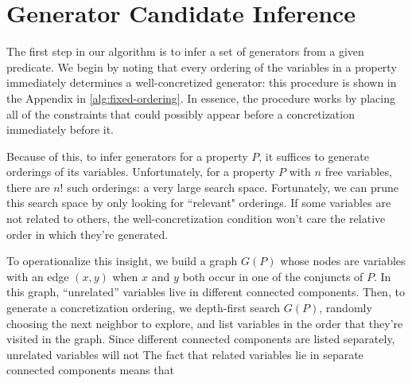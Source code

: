 \documentclass[sigconf,nonacm,review,anonymous]{acmart}
\begin{document}
\section{Generator Candidate Inference}
\label{sec:sci}
The first step in our algorithm is to infer a set of generators from a given
predicate. We begin by noting that every ordering of the variables in a property
immediately determines a well-concretized generator:
this procedure is shown in the Appendix in \autoref{alg:fixed-ordering}.
In essence, the procedure works by placing all of the constraints that could possibly
appear before a concretization immediately before it.

Because of this, to infer generators for a property $P$, it suffices to
generate orderings of its variables. Unfortunately, for a property $P$ with
$n$ free variables, there are $n!$ such orderings: a very large search space.
Fortunately, we can prune this search space by only looking for ``relevant"
orderings. If some variables are not related to others, the well-concretization
condition won't care the relative order in which they're generated.


To operationalize this insight, we build a graph $G(P)$ whose nodes are variables
with an edge $(x,y)$ when $x$ and $y$ both occur in one of the conjuncts of $P$. In
this graph, ``unrelated'' variables live in different connected components.
Then, to generate a concretization ordering, we depth-first search $G(P)$, randomly
choosing the next neighbor to explore,
and list variables in the order that they're visited in the graph.
Since different connected components are listed separately, unrelated variables
will not 
The fact that related variables lie in separate connected components means
that 

\end{document}
